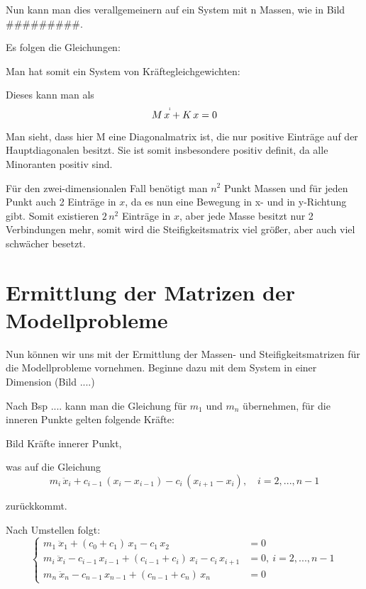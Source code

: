 \documentclass[ngerman,BCOR=4mm]{tudscrreprt}
\theoremstyle{plain} %
\theoremstyle{definition} %
\theoremstyle{remark}
\begin{document}
            Nun kann man dies verallgemeinern auf ein System mit n Massen, wie in Bild #########.

            Es folgen die Gleichungen:



            Man hat somit ein System von Kräftegleichgewichten:

            Dieses kann man als
            \begin{equation}
                  \label{eqn: MK Gleichung in 1D}
                  M\,x^{\dot\dot} + K\,x = 0
            \end{equation}

            Man sieht, dass hier M eine Diagonalmatrix ist, die nur positive Einträge auf der Hauptdiagonalen besitzt.
            Sie ist somit insbesondere positiv definit, da alle Minoranten positiv sind.

            Für den zwei-dimensionalen Fall benötigt man $n^2$ Punkt Massen und für jeden Punkt auch 2 Einträge in $x$, da es nun eine Bewegung in x- und in y-Richtung gibt.
            Somit existieren $2\,n^2$ Einträge in $x$, aber jede Masse besitzt nur 2 Verbindungen mehr, somit wird die Steifigkeitsmatrix \K viel größer, aber auch viel schwächer besetzt.
            

      
      \section{Ermittlung der Matrizen der Modellprobleme}
            Nun können wir uns mit der Ermittlung der Massen- und Steifigkeitsmatrizen für die Modellprobleme vornehmen.
            Beginne dazu mit dem System in einer Dimension (Bild ....)

            Nach Bsp .... kann man die Gleichung für $m_1$ und $m_n$ übernehmen, für die inneren Punkte gelten folgende Kräfte:

            Bild Kräfte innerer Punkt,

            was auf die Gleichung
            $$m_i\,\ddot x_i + c_{i-1}\,(x_i-x_{i-1}) - c_i\,(x_{i+1}-x_i), \quad i=2,...,n-1$$

            zurückkommt. 

            Nach Umstellen folgt:
            \begin{equation}
                  \label{eqn: System GDgl MK 1d}
                  \begin{cases}
                        m_1\ \ddot x_1 + (c_0+c_1)\,x_1 - c_1\,x_2 & = 0   \\
                        m_i\ \ddot x_i - c_{i-1}\,x_{i-1} + (c_{i-1}+c_i)\,x_i -c_i\,x_{i+1} & = 0,\ i=2,...,n-1 \\
                        m_n\ \ddot x_n - c_{n-1}\,x_{n-1} + (c_{n-1}+c_n)\,x_n & = 0
                  \end{cases}
            \end{equation}
\end{document}
